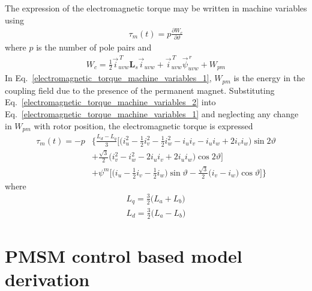 \documentclass[11pt,a4paper]{article}
\numberwithin{equation}{section}
\theoremstyle{it}
\theoremstyle{definition}
\begin{document}
\begin{onehalfspace}
The expression of the electromagnetic torque may be written in machine variables using
\begin{align}\label{electromagnetic_torque_machine_variables_1}
	\tau_m(t) = p\frac{\partial W_c}{\partial \vartheta}
\end{align}
where $p$ is the number of pole pairs and
\begin{align}\label{electromagnetic_torque_machine_variables_2}
	W_c = \frac{1}{2}\vec{i}_{uvw}^{\,T}\mathbf{L}_s\vec{i}_{uvw}+\vec{i}_{uvw}^{\,T}\vec{\psi}^{\,r}_{uvw}+W_{pm}
\end{align}
In Eq.~\ref{electromagnetic_torque_machine_variables_1}, $W_{pm}$ is the energy in the coupling field due to the presence of the permanent magnet. Substituting Eq.~\ref{electromagnetic_torque_machine_variables_2} into Eq.~\ref{electromagnetic_torque_machine_variables_1} and neglecting any change in $W_{pm}$ with rotor position, the electromagnetic torque is expressed
\begin{equation}\label{electromagnetic_torque_machine_variables_3}
	\begin{aligned}
		\tau_m(t) = -p&\Big\{\frac{L_d-L_q}{3}\Big[\Big(i_u^2-\frac{1}{2}i_v^2-\frac{1}{2}i_w^2 -i_ui_v-i_ui_w+2i_vi_w\Big)\sin2\vartheta \\[6pt]
		&+\frac{\sqrt{3}}{2}\big(i_v^2-i_w^2-2i_ui_v+2i_ui_w\big)\cos2\vartheta\Big] \\[6pt]
		&+ \psi^m\Big[\Big(i_u-\frac{1}{2}i_v-\frac{1}{2}i_w\Big)\sin\vartheta - \frac{\sqrt{3}}{2}\big(i_v-i_w\big)\cos\vartheta\Big]\Big\}
	\end{aligned}
\end{equation}
where 
\begin{align}
	L_q = \frac{3}{2}\Big(L_a+L_b\Big) \\[6pt]
	L_d = \frac{3}{2}\Big(L_a-L_b\Big)
\end{align}

\section{PMSM control based model derivation}

\end{onehalfspace}
\end{document}

